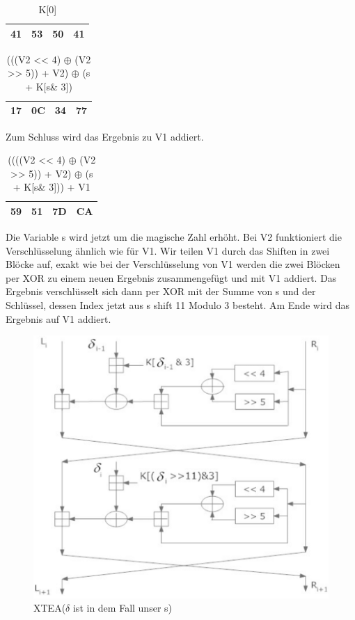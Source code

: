 \documentclass[course=asp]{aspdoc}
\begin{document}
\begin{table}[H]
\centering
    \begin{tabular}{|l|l|l|l|}
        \hline
        41 & 53 & 50 & 41    \\
        \hline
    \end{tabular}
    \caption{K[0]}
\end{table}

\begin{table}[H]
\centering
    \begin{tabular}{|l|l|l|l|}
        \hline
        17 & 0C & 34 & 77    \\
        \hline
    \end{tabular}
    \caption{(((V2 << 4) $\oplus$ (V2 >> 5)) + V2) $\oplus$ (s + K[s\& 3])}
\end{table}
Zum Schluss wird das Ergebnis zu V1 addiert.

\begin{table}[H]
\centering
    \begin{tabular}{|l|l|l|l|}
        \hline
        59 & 51 & 7D & CA    \\
        \hline
    \end{tabular}
    \caption{((((V2 << 4) $\oplus$ (V2 >> 5)) + V2) $\oplus$ (s + K[s\& 3])) + V1}
\end{table}



Die Variable s wird jetzt um die magische Zahl erhöht. Bei V2 funktioniert die Verschlüsselung ähnlich wie für V1. Wir teilen V1 durch das Shiften in zwei Blöcke auf, exakt wie bei der Verschlüsselung von V1 werden die zwei Blöcken per XOR zu einem neuen Ergebnis zusammengefügt und mit V1 addiert. Das Ergebnis verschlüsselt sich dann per XOR mit der Summe von s und der Schlüssel, dessen Index jetzt aus s shift 11 Modulo 3 besteht. Am Ende wird das Ergebnis auf V1 addiert.
\begin{figure}[h]
\centering
\includegraphics[scale = 0.55]{XTEA.png}
\caption{XTEA(${\delta}$ ist in dem Fall unser s)}
\end{figure}
\newpage
\end{document}
